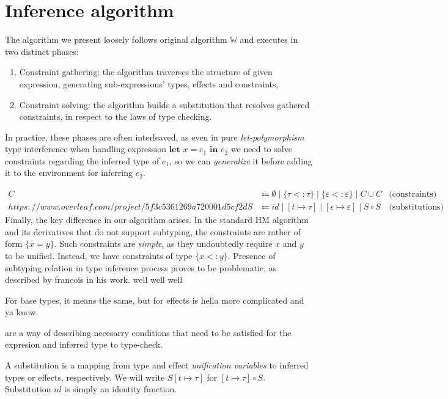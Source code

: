 \documentclass[declaration,shortabstract]{iithesis}
\theoremstyle{definition} \newtheorem{definition}{Definition}[section]
\begin{document}
\chapter{Inference algorithm}
The algorithm we present loosely follows original algorithm $\mathbb{W}$ and executes in two distinct phases:
\begin{enumerate}
    \item Constraint gathering: the algorithm traverses the structure of given expression,
    generating sub-expressions' types, effects and constraints,
    \item Constraint solving: the algorithm builds a substitution that resolves gathered constraints,
    in respect to the laws of type checking.
\end{enumerate}
In practice, these phases are often interleaved, as even in pure \textit{let-polymorphism} type interference when handling expression $\textbf{let } x = e_1 \textbf{ in } e_2$  we need to solve constraints regarding the inferred type of $e_1$, so we can \textit{generalize} it before adding it to the environment for inferring $e_2$.

\begin{align*}
 C & \Coloneqq  
    \emptyset  \mid  \{\tau <: \tau\} \mid \{\varepsilon <: \varepsilon\} \mid C \cup C 
    & \text{(constraints)}
\\https://www.overleaf.com/project/5f3c5361269a720001d5cf2d
 S & \Coloneqq 
    {id}  \mid  [t \mapsto  \tau] \mid [\epsilon \mapsto  \varepsilon] \mid S \circ S 
    &  \text{(substitutions)}
\end{align*}
Finally, the key difference in our algorithm arises.
In the standard HM algorithm and its derivatives that do not support subtyping, 
the constraints are rather of form $\{x = y\}$.
Such constraints are \textit{simple}, as they undoubtedly require $x$ and $y$
to be unified. Instead, we have constraints of type $\{x <: y\}$.
Presence of subtyping relation in type inference process proves to be
problematic, as described by francois in his work.
well well well

For base types, it means the same, but for effects is hella more complicated and ya know.

are a way of describing necesarry conditions that need to be satisfied
for the expresion and inferred type to type-check.


A substitution is a mapping from type and effect \textit{unification variables} to
inferred types or effects, respectively.
We will write $S[t \mapsto \tau]$ for $[t\mapsto \tau] \circ S$.
Substitution $id$ is simply an identity function.
\end{document}
